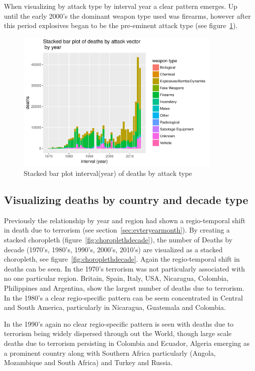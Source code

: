 When visualizing by attack type by interval year a clear pattern emerges. Up until the early 2000's the dominant weapon type used was firearms, however after this period explosives began to be the pre-eminent attack type (see figure~\ref{fig:stackbaryearweaptype}). 

\begin{figure}[t]
\includegraphics[width=10cm]{Peters_experiment_markdown_files/figure-latex/unnamed-chunk-9-1.pdf}
\caption{Stacked bar plot interval(year) of deaths by attack type}
\label{fig:stackbaryearweaptype}
\centering
\end{figure}

\subsection{Visualizing deaths by country and decade 
type}\label{viewing-deaths-by-attack-vector-type}

Previously the relationship by year and region had shown a regio-temporal shift in death due to terrorism (see section~\ref{sec:evteryearmonth}). By creating a stacked choropleth (figure~\ref{fig:choroplethdecade}), the number of Deaths by decade (1970's, 1980's, 1990's, 2000's, 2010's) are visualized as a stacked choropleth, see figure~\ref{fig:choroplethdecade}. Again the regio-temporal shift in deaths can be seen. In the 1970's terrorism was not particularly associated with no one particular region. Britain, Spain, Italy, USA, Nicaragua, Colombia, Philippines and Argentina, show the largest number of deaths due to terrorism. In the 1980's a clear regio-specific pattern can be seem concentrated in Central and South America, particularly in Nicaragua, Guatemala and Colombia.

In the 1990's again no clear regio-specific pattern is seen with deaths due to terrorism being widely dispersed through out the World, though large scale deaths due to terrorism persisting in Colombia and Ecuador, Algeria emerging as a prominent country along with Southern Africa particularly (Angola, Mozambique and  South Africa) and Turkey and Russia. 

